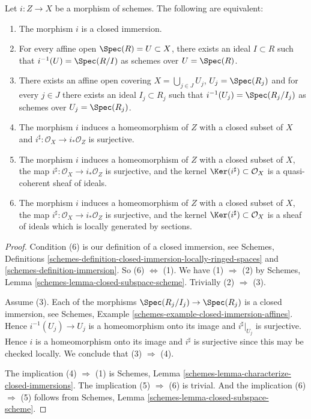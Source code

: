 \begin{lemma}
\label{lemma-closed-immersion}
Let $i : Z \to X$ be a morphism of schemes.
The following are equivalent:
\begin{enumerate}
\item The morphism $i$ is a closed immersion.
\item For every affine open $\Spec(R) = U \subset X$,
there exists an ideal $I \subset R$ such that
$i^{-1}(U) = \Spec(R/I)$ as schemes over $U = \Spec(R)$.
\item There exists an affine open covering $X = \bigcup_{j \in J} U_j$,
$U_j = \Spec(R_j)$ and for every $j \in J$ there exists
an ideal $I_j \subset R_j$ such that
$i^{-1}(U_j) = \Spec(R_j/I_j)$ as schemes over $U_j = \Spec(R_j)$.
\item The morphism $i$ induces a homeomorphism of $Z$ with a closed subset
of $X$ and $i^\sharp : \mathcal{O}_X \to i_*\mathcal{O}_Z$ is surjective.
\item The morphism $i$ induces a homeomorphism of $Z$ with a closed subset
of $X$, the map $i^\sharp : \mathcal{O}_X \to i_*\mathcal{O}_Z$ is surjective,
and the kernel $\Ker(i^\sharp)\subset \mathcal{O}_X$ is a quasi-coherent
sheaf of ideals.
\item The morphism $i$ induces a homeomorphism of $Z$ with a closed subset
of $X$, the map $i^\sharp : \mathcal{O}_X \to i_*\mathcal{O}_Z$ is surjective,
and the kernel $\Ker(i^\sharp)\subset \mathcal{O}_X$ is a
sheaf of ideals which is locally generated by sections.
\end{enumerate}
\end{lemma}

\begin{proof}
Condition (6) is our definition of a closed immersion, see Schemes,
Definitions \ref{schemes-definition-closed-immersion-locally-ringed-spaces}
and \ref{schemes-definition-immersion}.
So (6) $\Leftrightarrow$ (1). We have (1) $\Rightarrow$ (2) by
Schemes, Lemma \ref{schemes-lemma-closed-subspace-scheme}.
Trivially (2) $\Rightarrow$ (3).

\medskip\noindent
Assume (3). Each of the morphisms
$\Spec(R_j/I_j) \to \Spec(R_j)$ is
a closed immersion, see
Schemes, Example \ref{schemes-example-closed-immersion-affines}.
Hence $i^{-1}(U_j) \to U_j$ is a homeomorphism onto its image
and $i^\sharp|_{U_j}$ is surjective. Hence $i$ is a homeomorphism
onto its image and $i^\sharp$ is surjective since this may be
checked locally. We conclude that (3) $\Rightarrow$ (4).

\medskip\noindent
The implication (4) $\Rightarrow$ (1) is
Schemes, Lemma \ref{schemes-lemma-characterize-closed-immersions}.
The implication (5) $\Rightarrow$ (6) is trivial.
And the implication (6) $\Rightarrow$ (5) follows
from Schemes, Lemma \ref{schemes-lemma-closed-subspace-scheme}.
\end{proof}

